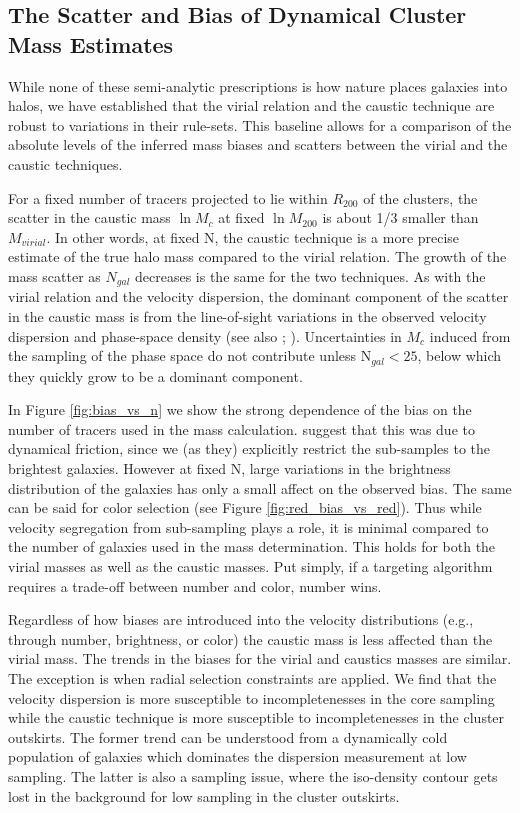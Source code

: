 \documentclass[iop]{emulateapj}
\begin{document}
\subsection{The Scatter and Bias of Dynamical Cluster Mass Estimates}
While none of these semi-analytic prescriptions is how nature places galaxies into halos, we have established that the virial relation and the caustic technique are robust to variations in their rule-sets. This baseline allows for a comparison of the absolute levels of the inferred mass biases and scatters between the virial and the caustic techniques.

For a fixed number of tracers projected to lie within $R_{200}$ of the clusters, the scatter in the caustic mass $\ln M_{c}$ at fixed $\ln M_{200}$ is about 1/3 smaller than $M_{virial}$.  In other words, at fixed N, the caustic technique is a more precise estimate of the true halo mass compared to the virial relation. The growth of the mass scatter as $N_{gal}$ decreases is the same for the two techniques. As with the virial relation and the velocity dispersion, the dominant component of the scatter in the caustic mass is from the line-of-sight variations in the observed velocity dispersion and phase-space density (see also \citet{White10}; \citet{Saro12}). Uncertainties in $M_{c}$ induced from the sampling of the phase space do not contribute unless N$_{gal} < 25$, below which they quickly grow to be a dominant component. 

In Figure \ref{fig:bias_vs_n} we show the strong dependence of the bias on the number of tracers used in the mass calculation. \citet{Saro12} suggest that this was due to dynamical friction, since we (as they) explicitly restrict the sub-samples to the brightest galaxies. However at fixed N, large variations in the brightness distribution of the galaxies has only a small affect on the observed bias. The same can be said for color selection (see Figure \ref{fig:red_bias_vs_red}). Thus while velocity segregation from sub-sampling plays a role, it is minimal compared to the number of galaxies used in the mass determination. This holds for both the virial masses as well as the caustic masses. Put simply, if a targeting algorithm requires a trade-off between number and color, number wins.

Regardless of how biases are introduced into the velocity distributions (e.g., through number, brightness, or color) the caustic mass is less affected than the virial mass. The trends in the biases for the virial and caustics masses are similar. The exception is when radial selection constraints are applied. We find that the velocity dispersion is more susceptible to incompletenesses in the core sampling while the caustic technique is more susceptible to incompletenesses in the cluster outskirts. The former trend can be understood from a dynamically cold population of galaxies which dominates the dispersion measurement at low sampling. The latter is also a sampling issue, where the iso-density contour gets lost in the background for low sampling in the cluster outskirts.
\end{document}
